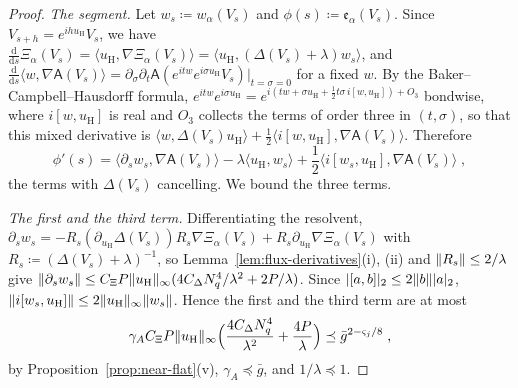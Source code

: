 \documentclass[11pt]{preprint}
\newcommand{\dd}{\mathrm{d}}
\DeclarePairedDelimiter{\abs}{\lvert}{\rvert}
\DeclarePairedDelimiter{\norm}{\lVert}{\rVert}
\numberwithin{equation}{section}
\theoremstyle{definition}
\theoremstyle{remark}
\theoremstyle{plain}
\begin{document}
\begin{proof}
\emph{The segment.} Let $w_s \coloneqq w_\alpha(V_s)$ and $\phi(s) \coloneqq \mathfrak e_\alpha(V_s)$. Since $V_{s+h} = e^{ihu_{\mathrm H}}V_s$, we have $\frac{\dd}{\dd s}\Xi_\alpha(V_s) = \langle u_{\mathrm H}, \nabla\Xi_\alpha(V_s)\rangle = \langle u_{\mathrm H}, (\Delta(V_s) + \lambda)w_s\rangle$, and $\frac{\dd}{\dd s}\langle w, \nabla\mathsf A(V_s)\rangle = \partial_\sigma\partial_t\mathsf A(e^{itw}e^{i\sigma u_{\mathrm H}}V_s)|_{t=\sigma=0}$ for a fixed $w$. By the Baker--Campbell--Hausdorff formula, $e^{itw}e^{i\sigma u_{\mathrm H}} = e^{i(tw + \sigma u_{\mathrm H} + \frac12t\sigma\,i[w, u_{\mathrm H}]) + O_3}$ bondwise, where $i[w, u_{\mathrm H}]$ is real and $O_3$ collects the terms of order three in $(t, \sigma)$, so that this mixed derivative is $\langle w, \Delta(V_s)u_{\mathrm H}\rangle + \frac12\langle i[w, u_{\mathrm H}], \nabla\mathsf A(V_s)\rangle$. Therefore
\begin{equation}\label{eq:defect-derivative}
    \phi'(s) = \bigl\langle\partial_sw_s, \nabla\mathsf A(V_s)\bigr\rangle - \lambda\langle u_{\mathrm H}, w_s\rangle + \frac12\bigl\langle i[w_s, u_{\mathrm H}], \nabla\mathsf A(V_s)\bigr\rangle\;,
\end{equation}
the terms with $\Delta(V_s)$ cancelling. We bound the three terms.

\emph{The first and the third term.} Differentiating the resolvent, $\partial_sw_s = -R_s(\partial_{u_{\mathrm H}}\Delta(V_s))R_s\nabla\Xi_\alpha(V_s) + R_s\partial_{u_{\mathrm H}}\nabla\Xi_\alpha(V_s)$ with $R_s \coloneqq (\Delta(V_s) + \lambda)^{-1}$, so Lemma~\ref{lem:flux-derivatives}(i), (ii) and $\norm{R_s} \leq 2/\lambda$ give $\norm{\partial_sw_s} \leq C_\Xi P\norm{u_{\mathrm H}}_\infty(4C_\Delta N_q^4/\lambda^2 + 2P/\lambda)$. Since $\abs{[a, b]}_2 \leq 2\norm b\abs a_2$, $\norm{i[w_s, u_{\mathrm H}]} \leq 2\norm{u_{\mathrm H}}_\infty\norm{w_s}$. Hence the first and the third term are at most
\begin{equation}\label{eq:defect-first-third}
    \gamma_AC_\Xi P\norm{u_{\mathrm H}}_\infty\Bigl(\frac{4C_\Delta N_q^4}{\lambda^2} + \frac{4P}{\lambda}\Bigr) \preceq \bar g^{2-\varsigma_j/8}\;,
\end{equation}
by Proposition~\ref{prop:near-flat}(v), $\gamma_A \preceq \bar g$, and $1/\lambda \preceq 1$.


\end{proof}
\end{document}
